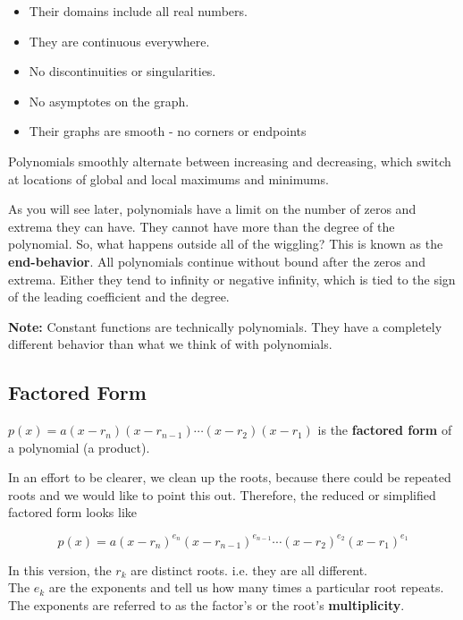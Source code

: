 \documentclass{ximera}
\begin{document}
\begin{itemize}
\item Their domains include all real numbers. 
\item They are continuous everywhere.
\item No discontinuities or singularities.
\item No asymptotes on the graph.
\item Their graphs are smooth - no corners or endpoints
\end{itemize}


Polynomials smoothly alternate between increasing and decreasing, which switch at locations of global and local maximums and minimums.

As you will see later, polynomials have a limit on the number of zeros and extrema they can have.  They cannot have more than the degree of the polynomial. So, what happens outside all of the wiggling?  This is known as the \textbf{end-behavior}.  All polynomials continue without bound after the zeros and extrema.  Either they tend to infinity or negative infinity, which is tied to the sign of the leading coefficient and the degree.


\textbf{Note:} Constant functions are technically polynomials. They have a completely different behavior than what we think of with polynomials.












\subsection*{Factored Form}








$p(x) = a (x-r_n)(x-r_{n-1})  \cdots (x-r_2)(x-r_1)$ is the \textbf{factored form} of a polynomial (a product).  

In an effort to be clearer, we clean up the roots, because there could be repeated roots and we would like to point this out.  Therefore, the reduced or simplified factored form looks like




\[   p(x) = a (x-r_n)^{e_n} (x-r_{n-1})^{e_{n-1}}  \cdots (x-r_2)^{e_2} (x-r_1)^{e_1}  \]



In this version, the $r_k$ are distinct roots. i.e. they are all different. \\
The $e_k$ are the exponents and tell us how many times a particular root repeats.  The exponents are referred to as the factor's or the root's \textbf{multiplicity}.
\end{document}
